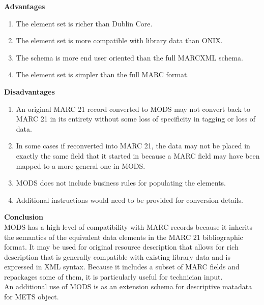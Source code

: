 \begin{enumerate}
	{\bf Advantages}
	\begin{enumerate}
		\item The element set is richer than Dublin Core.
		\item The element set is more compatible with library data than ONIX.
		\item The schema is more end user oriented than the full MARCXML schema.
		\item The element set is simpler than the full MARC format.
	\end{enumerate}	
	{\bf Disadvantages}
	\begin{enumerate}
		\item An original MARC 21 record converted to MODS may not convert back to MARC 21 in its entirety without some loss of specificity in tagging or loss of data.
		\item In some cases if reconverted into MARC 21, the data may not be placed in exactly the same field that it started in because a MARC field may have been mapped to a more general one in MODS.
		\item MODS does not include business rules for populating the elements.
		\item Additional instructions would need to be provided for conversion details.
	\end{enumerate}
	{\bf Conclusion}\\
	MODS has a high level of compatibility with MARC records because it inherits the semantics of the equivalent data elements in the MARC 21 bibliographic format. It may be used for original resource description that allows for rich description that is generally compatible with existing library data and is expressed in XML syntax. Because it includes a subset of MARC fields and repackages some of them, it is particularly useful for technician input.\\
	An additional use of MODS is as an extension schema for descriptive matadata for METS object.
	
	

\end{enumerate}
